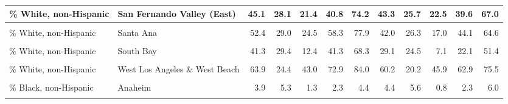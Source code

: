 \begin{table}[!h]
\begin{tabular}[t]{l|>{}l||r|r|r|r|r|r|r|r|r|r}
\hline
\% White, non-Hispanic & San Fernando Valley (East) & 45.1 & 28.1 & 21.4 & 40.8 & 74.2 & 43.3 & 25.7 & 22.5 & 39.6 & 67.0\\
\hline
\cellcolor{gray!6}{\% White, non-Hispanic} & \cellcolor{gray!6}{San Fernando Valley (West)} & \cellcolor{gray!6}{58.3} & \cellcolor{gray!6}{25.6} & \cellcolor{gray!6}{40.4} & \cellcolor{gray!6}{67.0} & \cellcolor{gray!6}{78.8} & \cellcolor{gray!6}{44.0} & \cellcolor{gray!6}{24.2} & \cellcolor{gray!6}{22.8} & \cellcolor{gray!6}{46.6} & \cellcolor{gray!6}{64.7}\\
\hline
\% White, non-Hispanic & Santa Ana & 52.4 & 29.0 & 24.5 & 58.3 & 77.9 & 42.0 & 26.3 & 17.0 & 44.1 & 64.6\\
\hline
\cellcolor{gray!6}{\% White, non-Hispanic} & \cellcolor{gray!6}{South \& South Central Los Angeles} & \cellcolor{gray!6}{7.3} & \cellcolor{gray!6}{13.6} & \cellcolor{gray!6}{1.1} & \cellcolor{gray!6}{2.3} & \cellcolor{gray!6}{5.5} & \cellcolor{gray!6}{6.3} & \cellcolor{gray!6}{11.4} & \cellcolor{gray!6}{0.6} & \cellcolor{gray!6}{1.9} & \cellcolor{gray!6}{6.6}\\
\hline
\% White, non-Hispanic & South Bay & 41.3 & 29.4 & 12.4 & 41.3 & 68.3 & 29.1 & 24.5 & 7.1 & 22.1 & 51.4\\
\hline
\cellcolor{gray!6}{\% White, non-Hispanic} & \cellcolor{gray!6}{South Orange Co} & \cellcolor{gray!6}{66.0} & \cellcolor{gray!6}{18.0} & \cellcolor{gray!6}{57.0} & \cellcolor{gray!6}{70.4} & \cellcolor{gray!6}{78.1} & \cellcolor{gray!6}{52.9} & \cellcolor{gray!6}{18.1} & \cellcolor{gray!6}{40.7} & \cellcolor{gray!6}{55.0} & \cellcolor{gray!6}{66.3}\\
\hline
\% White, non-Hispanic & West Los Angeles \& West Beach & 63.9 & 24.4 & 43.0 & 72.9 & 84.0 & 60.2 & 20.2 & 45.9 & 62.9 & 75.5\\
\hline
\cellcolor{gray!6}{\% White, non-Hispanic} & \cellcolor{gray!6}{Whittier \& North Orange Co} & \cellcolor{gray!6}{35.4} & \cellcolor{gray!6}{20.5} & \cellcolor{gray!6}{18.5} & \cellcolor{gray!6}{31.2} & \cellcolor{gray!6}{50.7} & \cellcolor{gray!6}{22.4} & \cellcolor{gray!6}{15.3} & \cellcolor{gray!6}{10.9} & \cellcolor{gray!6}{17.5} & \cellcolor{gray!6}{32.7}\\
\hline
\% Black, non-Hispanic & Anaheim & 3.9 & 5.3 & 1.3 & 2.3 & 4.4 & 4.4 & 5.6 & 0.8 & 2.3 & 6.0\\
\hline
\hline
\cellcolor{gray!6}{\% Black, non-Hispanic} & \cellcolor{gray!6}{Covina \& West Covina} & \cellcolor{gray!6}{4.1} & \cellcolor{gray!6}{4.2} & \cellcolor{gray!6}{1.4} & \cellcolor{gray!6}{3.0} & \cellcolor{gray!6}{5.2} & \cellcolor{gray!6}{3.2} & \cellcolor{gray!6}{3.1} & \cellcolor{gray!6}{0.8} & \cellcolor{gray!6}{2.3} & \cellcolor{gray!6}{4.7}\\

\end{tabular}
\end{table}
